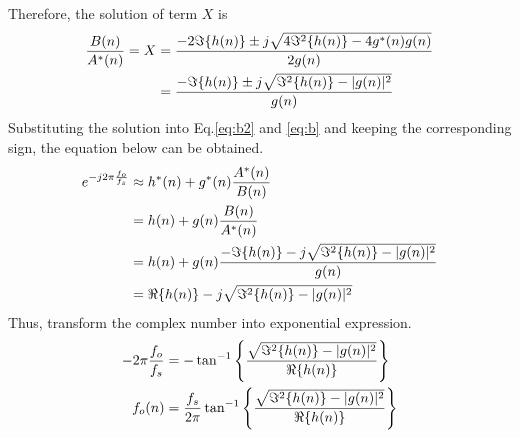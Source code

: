 Therefore, the solution of term $X$ is
\begin{align}
\frac{B(n)}{A^*(n)}=X
&=\frac{-2\Im\{h(n)\}\pm j\sqrt{4\Im^2\{h(n)\}-4g^*(n)g(n)}}{2g(n)}\notag\\
&=\frac{-\Im\{h(n)\}\pm j\sqrt{\Im^2\{h(n)\}-|g(n)|^2}}{g(n)}\label{eq:X}
\end{align}
Substituting the solution into Eq.\ref{eq:b2} and \ref{eq:b} and keeping the corresponding sign, the equation below can be obtained.
\begin{align}
e^{-j2\pi\frac{f_o}{f_s}}
&\approx h^*(n)+g^*(n)\frac{A^*(n)}{B(n)}\notag\\
&=h(n)+g(n)\frac{B(n)}{A^*(n)}\notag\\
&=h(n)+g(n)\frac{-\Im\{h(n)\}- j\sqrt{\Im^2\{h(n)\}-|g(n)|^2}}{g(n)}\notag\\
&=\Re\{h(n)\}- j\sqrt{\Im^2\{h(n)\}-|g(n)|^2}\label{eq:final}
\end{align}
Thus, transform the complex number into exponential expression.
\begin{align}
-2\pi\frac{f_o}{f_s}&=-\tan^{-1}\left\{ \frac{\sqrt{\Im^2\{h(n)\}-|g(n)|^2}}{\Re\{h(n)\}}\right\} \notag\\
f_o(n)&=\frac{f_s}{2\pi}\tan^{-1}\left\{ \frac{\sqrt{\Im^2\{h(n)\}-|g(n)|^2}}{\Re\{h(n)\}}\right\}
\end{align}
